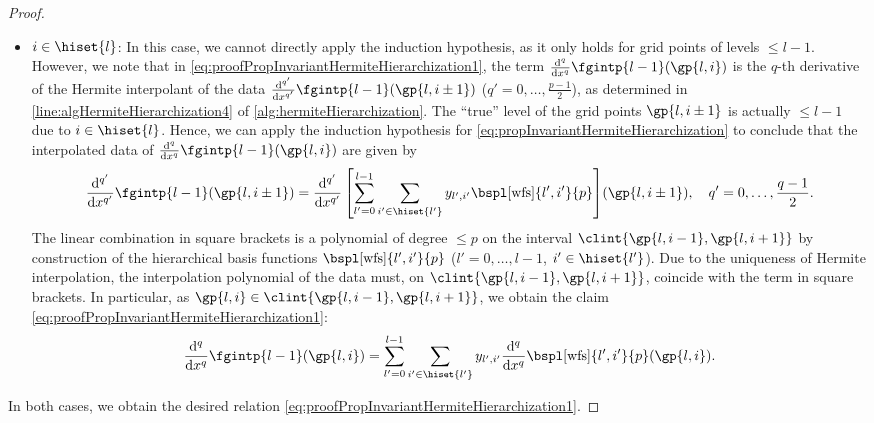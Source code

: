 \begin{proof}
\begin{itemize}
    \item
    $i \in \hiset{l}$:
    In this case, we cannot directly apply the induction hypothesis,
    as it only holds for grid points of levels $\le l - 1$.
    However, we note that in
    \eqref{eq:proofPropInvariantHermiteHierarchization1},
    the term $\frac{\diff^q}{\dx^q} \fgintp{l-1}(\gp{l,i})$
    is the $q$-th derivative of the Hermite interpolant of
    the data $\frac{\diff^{q'}}{\dx^{q'}} \fgintp{l-1}(\gp{l,i\pm1})$
    ($q' = 0, \dotsc, \frac{p-1}{2}$),
    as determined in \cref{line:algHermiteHierarchization4}
    of \cref{alg:hermiteHierarchization}.
    The ``true'' level of the grid points $\gp{l,i\pm1}$ is
    actually $\le l - 1$ due to $i \in \hiset{l}$.
    Hence, we can apply the induction hypothesis
    for \cref{eq:propInvariantHermiteHierarchization}
    to conclude that the interpolated data of
    $\frac{\diff^q}{\dx^q} \fgintp{l-1}(\gp{l,i})$ are given by
    \begin{equation}
      \frac{\diff^{q'}}{\dx^{q'}} \fgintp{l-1}(\gp{l,i\pm1})
      = \frac{\diff^{q'}}{\dx^{q'}}
      \left[\sum_{l'=0}^{l-1} \sum_{i' \in \hiset{l'}}
      \linout{l',i'} \bspl[\wfs]{l',i'}{p}\right]\!(\gp{l,i\pm1}),\quad
      q' = 0, \dotsc, \frac{q-1}{2}.
    \end{equation}
    The linear combination in square brackets
    is a polynomial of degree $\le p$ on the interval
    $\clint{\gp{l,i-1}, \gp{l,i+1}}$
    by construction of the hierarchical basis functions
    $\bspl[\wfs]{l',i'}{p}$ ($l' = 0, \dotsc, l - 1$, $i' \in \hiset{l'}$).
    Due to the uniqueness of Hermite interpolation,
    the interpolation polynomial of the data must,
    on $\clint{\gp{l,i-1}, \gp{l,i+1}}$,
    coincide with the term in square brackets.
    In particular, as $\gp{l,i} \in \clint{\gp{l,i-1}, \gp{l,i+1}}$,
    we obtain the claim \eqref{eq:proofPropInvariantHermiteHierarchization1}:
    \begin{equation}
      \frac{\diff^q}{\dx^q} \fgintp{l-1}(\gp{l,i})
      = \sum_{l'=0}^{l-1} \sum_{i' \in \hiset{l'}}
      \linout{l',i'} \frac{\diff^q}{\dx^q} \bspl[\wfs]{l',i'}{p}(\gp{l,i}).
    \end{equation}
  \end{itemize}
  In both cases, we obtain the desired relation
  \eqref{eq:proofPropInvariantHermiteHierarchization1}.
\end{proof}

